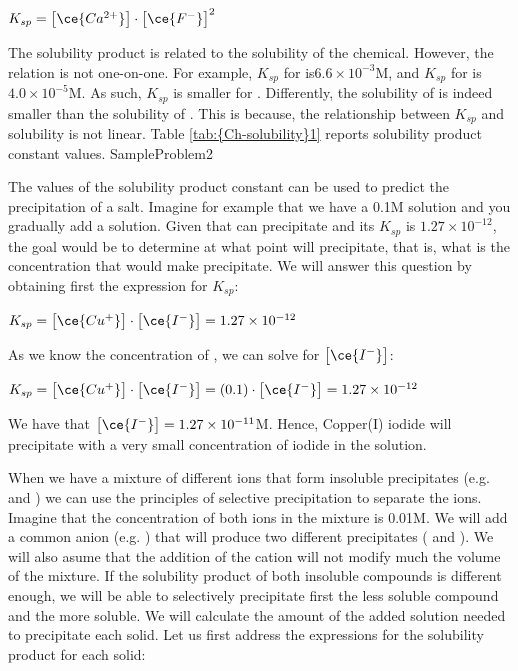 \documentclass[main.tex]{subfiles}
\newcommand\chapterlabel{Ch-solubility}\setcounter{figurenewcounter}{0}\setcounter{tablenewcounter}{0}\setcounter{formulanewcounter}{0}
\begin{document}
\begin{description}
\begin{center}\hfill $K_{sp}= \big[ \ce{Ca^{2+}} \big]\cdot \big[ \ce{F^-} \big]^2$\end{center}
The solubility product is related to the solubility of the chemical. However, the relation is not one-on-one. For example, $K_{sp}$ for  is$6.6\times 10^{-3}$M, and $K_{sp}$ for  is $4.0\times 10^{-5}$M. As such, $K_{sp}$ is smaller for . Differently, the solubility of  is indeed smaller than the solubility of . This is because, the relationship between $K_{sp}$ and solubility is not linear. Table \ref{tab:{\chapterlabel}1} reports solubility product constant values.
  {SampleProblem2}
\item[\docfilehook{Predicting precipitation: an introduction}{}]
The values of the solubility product constant can be used to predict the precipitation of a salt. Imagine for example that we have a 0.1M  solution and you gradually add a  solution. Given that  can precipitate and its $K_{sp}$ is $1.27\times 10^{-12}$, the goal would be to determine at what point will  precipitate, that is, what is the  concentration that would make  precipitate. We will answer this question by obtaining first the expression for $K_{sp}$:
\begin{center}\hfill $K_{sp}= \big[ \ce{Cu^{+}} \big]\cdot \big[ \ce{I^{-}} \big]=1.27\times 10^{-12}$\end{center}
As we know the concentration of , we can solve for $\big[ \ce{I^{-}} \big]$:
\begin{center}$K_{sp}= \big[ \ce{Cu^{+}} \big]\cdot \big[ \ce{I^{-}} \big]=(0.1)\cdot\big[ \ce{I^{-}} \big]=1.27\times 10^{-12}$\end{center}
We have that $\big[ \ce{I^{-}} \big]=1.27\times 10^{-11}$M. Hence, Copper(I) iodide will precipitate with a very small concentration of iodide in the solution. 
\item[\docfilehook{Selective precipitation}{}] When we have a mixture of different ions that form insoluble precipitates (e.g.  and ) we can use the principles of selective precipitation to separate the ions. Imagine that the concentration of both ions in the mixture is 0.01M. We will add a common anion (e.g. ) that will produce two different precipitates ( and ). We will also asume that the addition of the cation will not modify much the volume of the mixture. If the solubility product of both insoluble compounds is different enough, we will be able to selectively precipitate first the less soluble compound and the more soluble. We will calculate the amount of the added solution needed to precipitate each solid. Let us first address the expressions for the solubility product for each solid:

\end{description}
\end{document}
